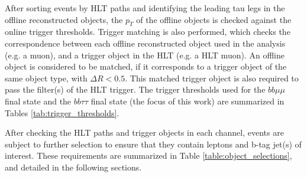 After sorting events by HLT paths and identifying the leading tau legs in the offline reconstructed objects, the $p_{T}$ of the offline objects is checked against the online trigger thresholds. Trigger matching is also performed, which checks the correspondence between each offline reconstructed object used in the analysis (e.g. a muon), and a trigger object in the HLT (e.g. a HLT muon). An offline object is considered to be matched, if it corresponds to a trigger object of the same object type, with $\Delta R < 0.5$. This matched trigger object is also required to pass the filter(s) of the HLT trigger. The trigger thresholds used for the $bb\mu\mu$ final state and the $bb\tau\tau$ final state (the focus of this work) are summarized in Tables \ref{tab:trigger_thresholds}.

After checking the HLT paths and trigger objects in each channel, events are subject to further selection to ensure that they contain leptons and b-tag jet(s) of interest. These requirements are summarized in Table \ref{table:object_selections}, and detailed in the following sections. 

